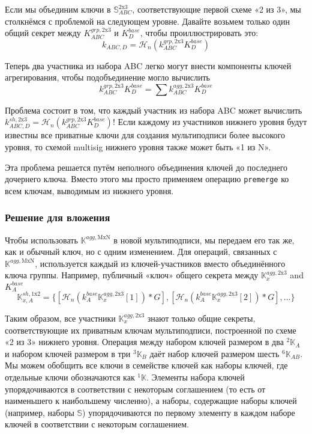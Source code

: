 Если мы объединим ключи в $\mathbb{S}^{\textrm{2x3}}_{ABC}$, соответствующие первой схеме «2 из 3», мы столкнёмся с проблемой на следующем уровне. Давайте возьмем только один общий секрет между $K^{grp,\textrm{2x3}}_{ABC}$ и $K^{base}_D$, чтобы проиллюстрировать это:\vspace{.175cm}
\[k_{ABC,D} = \mathcal{H}_n(k^{grp,\textrm{2x3}}_{ABC} K^{base}_D)\]

Теперь два участника из набора ABC легко могут внести компоненты ключей агрегирования, чтобы подобъединение могло вычислить
\[k^{grp,\textrm{2x3}}_{ABC} K^{base}_D = \sum k^{agg,\textrm{2x3}}_{ABC} K^{base}_D\]

Проблема состоит в том, что каждый участник из набора ABC может вычислить $k^{sh,\textrm{2x3}}_{ABC,D} = \mathcal{H}_n(k^{grp,\textrm{2x3}}_{ABC} K^{base}_D)$! Если каждому из участников нижнего уровня будут известны все приват\-ные ключи для создания мультиподписи более высокого уровня, то схемой multisig нижнего уровня также может быть «1 из N».

Эта проблема решается путём неполного объединения ключей до последнего дочернего ключа. Вместо этого мы просто применяем операцию {\tt premerge} ко всем ключам, выводимым из нижнего уровня.

\subsubsection*{Решение для вложения}

Чтобы использовать $\mathbb{K}^{agg,\textrm{MxN}}$ в новой мультиподписи, мы передаем его так же, как и обычный ключ, но с одним изменением. Для операций, связанных с $\mathbb{K}^{agg,\textrm{MxN}}$, используется каждый из ключей-участников вместо объединённого ключа группы. Например, публичный «ключ» общего секрета между $\mathbb{K}^{agg,\textrm{2x3}}_x$ and $K^{base}_A$\vspace{.175cm}
\[\mathbb{K}^{sh,\textrm{1x2}}_{x,A} = \{ [\mathcal{H}_n(k^{base}_A \mathbb{K}^{agg,\textrm{2x3}}_x[1])*G], [\mathcal{H}_n(k^{base}_A \mathbb{K}^{agg,\textrm{2x3}}_x[2])*G], ...\}\]

Таким образом, все участники $\mathbb{K}^{agg,\textrm{2x3}}_x$ знают только общие секреты, соответствующие их приватным ключам мультиподписи, построенной по схеме «2 из 3» нижнего уровня. Операция между набором ключей размером в два ${}^{2}\mathbb{K}_A$ и набором ключей размером в три ${}^{3}\mathbb{K}_B$ даёт набор ключей размером шесть ${}^{6}\mathbb{K}_{AB}$. Мы можем обобщить все ключи в семействе ключей как наборы ключей, где отдельные ключи обозначаются как ${}^{1}\mathbb{K}$. Элементы набора ключей упорядочиваются в соответствии с некоторым соглашением (то есть от наименьшего к наи\-большему численно), а наборы, содержащие наборы ключей (например, наборы $\mathbb{S}$) упорядо\-чиваются по первому элементу в каждом наборе ключей в соответствии с некоторым соглаше\-нием.\\

